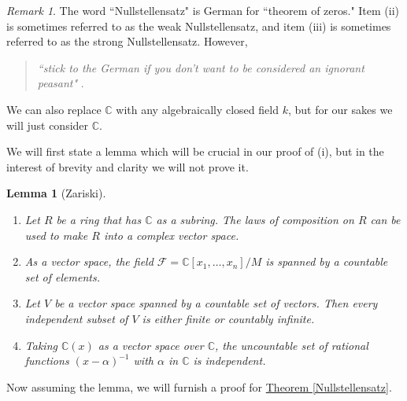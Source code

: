 \documentclass[letterpaper]{article}
\newtheorem{lemma}[theorem]{Lemma}
\theoremstyle{definition}
\theoremstyle{remark}
\newtheorem{remark}[theorem]{Remark}
\newcommand\CC{\mathbb{C}}
\begin{document}
\begin{remark}
    The word ``Nullstellensatz" is German for ``theorem of zeros." Item (ii) is sometimes referred to as the weak Nullstellensatz, and item (iii) is sometimes referred to as the strong Nullstellensatz. However,
    \begin{quote}
        \textit{``stick to the German if you don't want to be considered an ignorant peasant"} \cite{reid}. 
    \end{quote}
	We can also replace \(\CC{}\) with any algebraically closed field \(k\), but for our sakes we will just consider \(\CC\). 
\end{remark}

We will first state a lemma which will be crucial in our proof of (i), but in the interest of brevity and clarity we will not prove it. \begin{lemma}[Zariski]\label{Zariski} $~$
			\begin{enumerate}[label=(\roman*)]
				\item Let \(R\) be a ring that has \(\CC{}\) as a subring. The laws of composition on \(R\) can be used to make \(R\) into a complex vector space. 
				\item As a vector space, the field \(\mathcal F=\CC[x_1,\dots,x_n]/M\) is spanned by a countable set of elements. 
				\item Let \(V\) be a vector space spanned by a countable set of vectors. Then every independent subset of \(V\) is either finite or countably infinite. 
				\item Taking \(\CC(x)\) as a vector space over \(\CC{}\), the uncountable set of rational functions \((x-\alpha)^{-1}\) with \(\alpha\) in \(\CC\) is independent. 
			\end{enumerate}
		\end{lemma}
Now assuming the lemma, we will furnish a proof for \hyperref[Nullstellensatz]{Theorem \ref*{Nullstellensatz}}.
\end{document}
